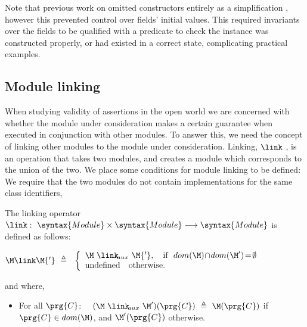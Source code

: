 Note that previous work on \Chainmail omitted constructors entirely as a simplification \cite{FASE}, however this prevented control over fields' initial values.  This required invariants over the fields to be qualified with a predicate to check the instance was constructed properly, or had existed in a correct state, complicating practical examples.

\subsection{Module linking}

When studying validity of assertions in the open world we are concerned with whether   the  module
under consideration makes  a certain guarantee when executed in conjunction with other modules. To answer this, we
 need the concept of linking other modules to the module  under consideration.
 Linking, $\link$ ,  is an operation that takes two modules, and creates a module which corresponds  to the union of the two.
We place some conditions for module linking to be defined: We require that the two modules do not contain implementations for the same class identifiers,



\begin{definition}
\label{def:link}
The linking operator\  \ $\link:\  \syntax{Module} \times  \syntax{Module} \longrightarrow \syntax{Module}$ is defined as follows:

$
\M \link \M{'}  \ \triangleq  \ \ \left\{
\begin{array}{l}
                        \M\ \link\!_{aux}\ \M{'},\ \ \   \hbox{if}\  \ dom(\M)\!\cap\!dom(\M')\!=\!\emptyset\\
\mbox{undefined}  \ \ \ \mbox{otherwise.}
\end{array}
                    \right.$

and where,
\begin{itemize}
     \item
   For all  $\prg{C}$: \ \
   $(\M\ \link\!_{aux}\ \M')(\prg{C})\  \triangleq  \ \M(\prg{C})$  if  $\prg{C}\in dom(\M)$, and  $\M'(\prg{C})$ otherwise.
 \end{itemize}
\end{definition}

